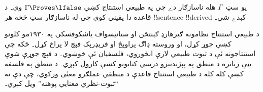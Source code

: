 \documentclass[../../../include/open-logic-section]{subfiles}
\begin{document}
يو سټ~$\Gamma$ هله ناسازګار دے چې په طبيعي استنتاج کښې
$\Gamma \Proves \lfalse$ وي۔ د \FalseInt{} قاعده دا يقيني کوي چې له
ناسازګار سټ څخه هر !!{sentence} !!{derive}d کېدے شي۔

د طبيعي استنتاج نظامونه ګيرهارډ ګېنتڅن او ستانيسواف ياشکوفسکي په
۱۹۳۰مو کلونو کښې جوړ کړل، او وروسته ډاګ پراوېڅ او فريډرېک فېچ لا
پراخ کړل۔ ځکه چې استنتاجونه ئې د ثبوت طبيعي لارې انځوروي، فلسفيان
ئې خوښوي۔ د فېچ جوړې شوې بڼې زياتره د منطق په پېژندنيزو درسي
کتابونو کښې کارول کېږي۔ د منطق په فلسفه کښې کله کله د طبيعي استنتاج
قاعدې د منطقي عملګرو معنٰی ورکوي، چې دې ته ``ثبوت-نظري معنايي
پوهنه'' ويل کېږي۔
\end{document}

